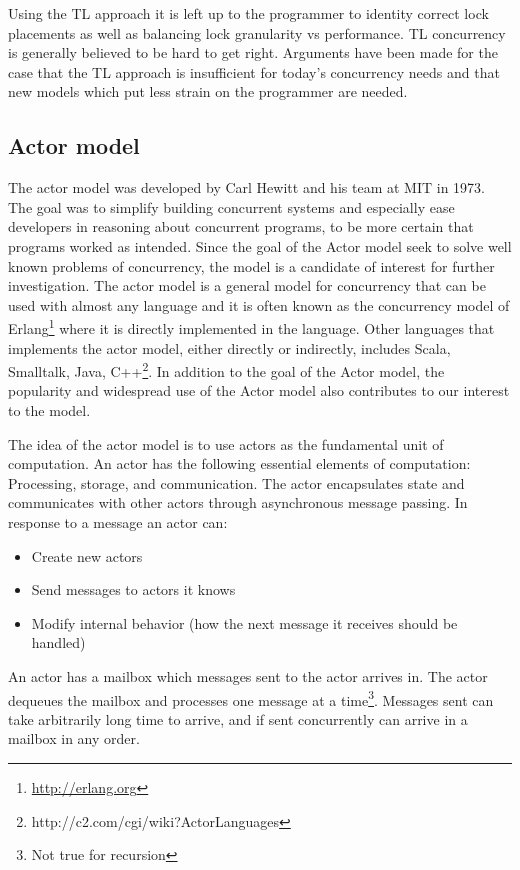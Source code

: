 Using the \ac{TL} approach it is left up to the programmer to identity correct lock placements as well as balancing lock granularity vs performance\cite[p. 49]{harris2005composable}. \ac{TL} concurrency is generally believed to be hard to get right\cite[p. 92]{herlihy2003software}. Arguments have been made for the case that the \ac{TL} approach is insufficient for today's concurrency needs and that new models which put less strain on the programmer are needed\cite[p. 3]{jones2007beautiful}\cite[p. 48]{harris2005composable}.


\subsection{Actor model}
The actor model was developed by Carl Hewitt and his team at MIT in 1973\cite{hewitt1973universal}. The goal was to simplify building concurrent systems and especially ease developers in reasoning about concurrent programs, to be more certain that programs worked as intended\cite[p. 14]{haller2012actors}. Since the goal of the Actor model seek to solve well known problems of concurrency, the model is a candidate of interest for further investigation. The actor model is a general model for concurrency that can be used with almost any language and it is often known as the concurrency model of Erlang\footnote{\url{http://erlang.org}} where it is directly implemented in the language\cite[p. 115]{sevenModels}. Other languages that implements the actor model, either directly or indirectly, includes Scala, Smalltalk, Java, C++\footnote{http://c2.com/cgi/wiki?ActorLanguages}. In addition to the goal of the Actor model,  the popularity and widespread use of the Actor model also contributes to our interest to the model.

The idea of the actor model is to use actors as the fundamental unit of computation. An actor has the following essential elements of computation\cite{actorLangNextVideo}: Processing, storage, and communication. The actor encapsulates state and communicates with other actors through asynchronous message passing. In response to a message an actor can\cite{hewitt2014actor}:
\begin{itemize}
\item Create new actors
\item Send messages to actors it knows
\item Modify internal behavior (how the next message it receives should be handled)
\end{itemize}
An actor has a mailbox which messages sent to the actor arrives in. The actor dequeues the mailbox and processes one message at a time\footnote{Not true for recursion\cite{actorLangNextVideo}}. Messages sent can take arbitrarily long time to arrive, and if sent concurrently can arrive in a mailbox in any order\cite{hewitt2014actor}.

